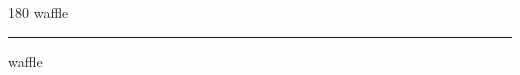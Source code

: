 
\begin{frame}
\begin{center}
\begin{turn}{180}
{\fontsize{2.5cm}{1em}\selectfont waffle}
\end{turn}
\vspace{1em}\par  
\hrule
\vspace{1em}\par  
{\fontsize{2.5cm}{1em}\selectfont waffle}
\end{center}
\end{frame}
